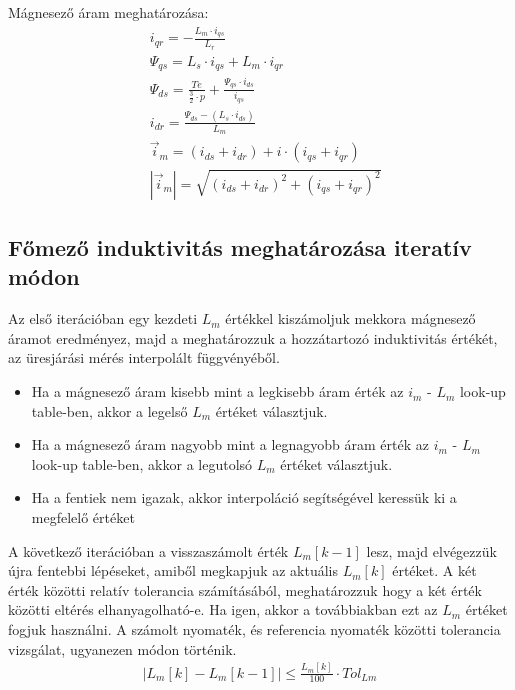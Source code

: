 \documentclass[a4paper,12pt]{article}
\begin{document}
			Mágnesező áram meghatározása:
			\begin{align}
				& i_{qr} = - \frac{L_m \cdot i_{qs}}{L_r} \\
				& \Psi_{qs} = L_s \cdot i_{qs} + L_m \cdot i_{qr} \\
				& \Psi_{ds} = \frac{Te}{\frac{3}{2} \cdot p } + \frac{\Psi_{qs} \cdot i_{ds}}{i_{qs}} \\
				& i_{dr} = \frac{\Psi_{ds} - (L_s \cdot i_{ds} ) }{L_{m}} \\
				& \vec{i}_{m} =  (i_{ds} + i_{dr}) + i \cdot (i_{qs} + i_{qr})  \\
				& |\vec{i}_{m}| = \sqrt{(i_{ds} + i_{dr})^2 + (i_{qs} + i_{qr})^2}
			\end{align}
			
		\subsection{Főmező induktivitás meghatározása iteratív módon  }	
		
			Az első iterációban egy kezdeti $ L_m $ értékkel kiszámoljuk mekkora mágnesező áramot eredményez, majd a meghatározzuk a hozzátartozó induktivitás értékét, az üresjárási mérés interpolált függvényéből.
			
			\begin{itemize}
				\item Ha a mágnesező áram kisebb mint a legkisebb áram érték az $i_m$ - $L_m$ look-up table-ben, akkor a legelső $L_m $ értéket választjuk.
				\item Ha a mágnesező áram nagyobb mint a legnagyobb áram  érték az $i_m$ - $L_m$ look-up table-ben, akkor a legutolsó $L_m $ értéket választjuk. 
				\item Ha a fentiek nem igazak, akkor interpoláció segítségével keressük ki a megfelelő értéket
			\end{itemize}
			
			A következő iterációban a visszaszámolt érték $L_m [k-1]$ lesz, majd elvégezzük újra fentebbi lépéseket, amiből megkapjuk az aktuális $L_m [k]$ értéket. A két érték közötti relatív tolerancia számításából, meghatározzuk hogy a két érték közötti eltérés elhanyagolható-e. Ha igen, akkor a továbbiakban ezt az $ L_m $ értéket fogjuk használni. A számolt nyomaték, és referencia nyomaték közötti tolerancia vizsgálat, ugyanezen módon történik.
			\begin{align}
				| L_m [k] - L_m [k-1] |  \leq \frac{L_m [k]}{100} \cdot Tol_{Lm}
			\end{align}
					
\end{document}
